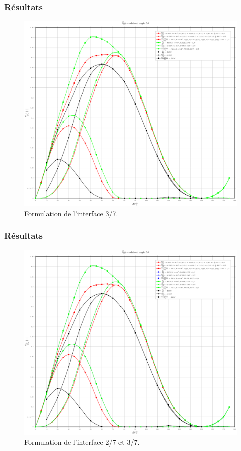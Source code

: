 \documentclass[first,firstsupp,lastsupp,handout,last,hyperref,table]{ETHclass}
\begin{document}
\begin{frame}
\frametitle{R\'esultats}
\vspace{-0.7cm}
\centering
\captionsetup[figure]{font=scriptsize,labelfont=scriptsize}
\begin{figure}[!h]
\centering
\includegraphics[height=0.7\textheight]{2017-05-03_AbqRunSummary_GsoverG0_FEM-BEM-comparison.pdf}
  \caption{\scriptsize Formulation de l'interface 3/7.}
  \label{fig:res1}
\end{figure}
\end{frame}

\begin{frame}
\frametitle{R\'esultats}
\vspace{-0.7cm}
\centering
\captionsetup[figure]{font=scriptsize,labelfont=scriptsize}
\begin{figure}[!h]
\centering
\includegraphics[height=0.7\textheight]{2017-04-29_05-03_AbqRunSummary_GsoverG0_FEM-BEM-comparison.pdf}
  \caption{\scriptsize Formulation de l'interface 2/7 et 3/7.}
  \label{fig:res1}
\end{figure}
\end{frame}
\end{document}
